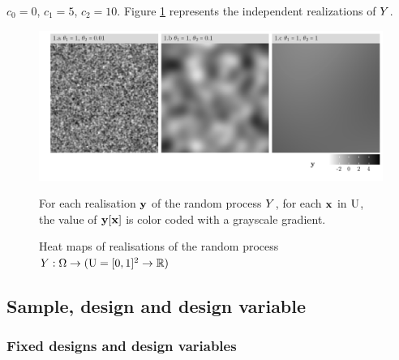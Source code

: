  $c_0=0$, $c_1=5$, $c_2=10$.
Figure \ref{fig:oaijsfdoij} represents the independent realizations of $Y$.
\begin{figure}[H]

    \caption{Heat maps of realisations of the random process $Y:\Omega\to(\mathrm{U}=[0,1]^2\to\mathbb{R})$}
    \label{fig:oaijsfdoij}
    
\hspace{-.6cm}\includegraphics{fig/figure1.pdf}

    \vspace{-.4cm}
    {\footnotesize For each realisation $\mathbf{y}$ of the random process $Y$, for each $\mathbf{x}$ in $\mathrm{U}$, the value of $\mathbf{y}[\mathbf{x}]$ is color coded with a grayscale gradient.}
\end{figure}




\subsection{Sample, design and design variable} \label{sec:design}

\subsubsection{Fixed designs and design variables}

